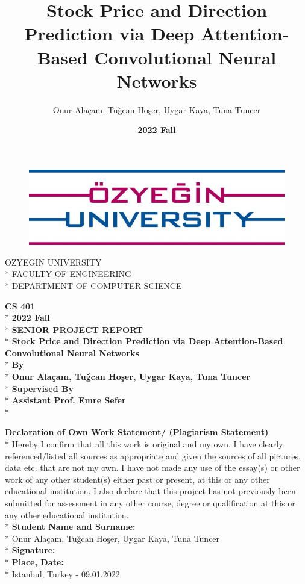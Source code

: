 \documentclass{article}
\title{\textbf{Stock Price and Direction Prediction via Deep Attention-Based Convolutional Neural Networks}}
\author{Onur Alaçam, Tuğcan Hoşer, Uygar Kaya, Tuna Tuncer}
\date{\textbf{2022 Fall}}
\begin{document}
\begin{figure}[h]
    \begin{center}
        \includegraphics[]{Assets/OzU.png}
    \end{center}
\end{figure}

\begin{center}
    OZYEGIN UNIVERSITY\\*
    FACULTY OF ENGINEERING\\*
    DEPARTMENT OF COMPUTER SCIENCE
\end{center}

\begin{center}
    \textbf{CS 401}\\* \vspace{0.2cm}
    \textbf{2022 Fall}\\* \vspace{0.4cm}
    \textbf{SENIOR PROJECT REPORT}\\* \vspace{0.6cm}
    \textbf{Stock Price and Direction Prediction via Deep Attention-Based Convolutional Neural Networks}\\* \vspace{0.8cm}
    \textbf{By}\\*
    \textbf{Onur Alaçam, Tuğcan Hoşer, Uygar Kaya, Tuna Tuncer}\\* \vspace{0.6cm}
    \textbf{Supervised By}\\*
    \textbf{Assistant Prof. Emre Sefer}\\* \vspace{0.6cm}
\end{center}
\textbf{Declaration of Own Work Statement/ (Plagiarism Statement)}\\*
Hereby I confirm that all this work is original and my own. I have clearly referenced/listed all sources as appropriate and given the sources of all pictures, data etc. that are not my own. I have not made any use of the essay(s) or other work of any other student(s) either past or present, at this or any other educational institution. I also declare that this project has not previously been submitted for assessment in any other course, degree or qualification at this or any other educational institution.\vspace{0.2cm}\\*
\textbf{Student Name and Surname:}\\* Onur Alaçam, Tuğcan Hoşer, Uygar Kaya, Tuna Tuncer \vspace{0.1cm}\\*
\textbf{Signature:} \vspace{0.9cm}\\*
\textbf{Place, Date:}\\* Istanbul, Turkey - 09.01.2022
\end{document}
